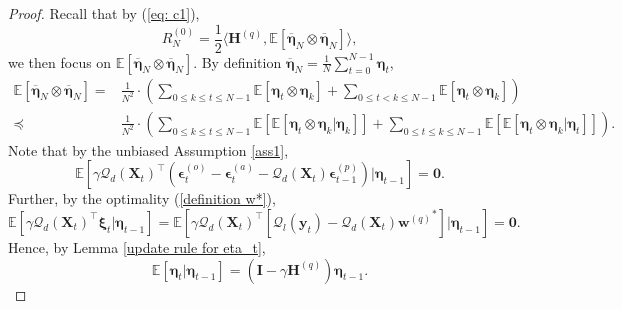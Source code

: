 \documentclass[11pt, letterpaper]{article}
\begin{document}
\begin{proof}
    Recall that by (\ref{eq: c1}),
    \begin{equation*}
        R_N^{(0)}=\frac{1}{2}\langle\mathbf{H}^{(q)},\mathbb{E}[\overline{\boldsymbol{\eta}}_N\otimes\overline{\boldsymbol{\eta}}_N]\rangle,
    \end{equation*}
    we then focus on $\mathbb{E}[\overline{\boldsymbol{\eta}}_{N}\otimes\overline{\boldsymbol{\eta}}_{N}]$. By definition $\overline{\boldsymbol{\eta}}_{N}=\frac{1}{N}\sum_{t=0}^{N-1}\boldsymbol{\eta}_{t}$,
    \begin{equation}
    \label{D0}
        \begin{aligned}
            \mathbb{E}[\overline{\boldsymbol{\eta}}_{N}\otimes\overline{\boldsymbol{\eta}}_{N}]
            =&\frac{1}{N^2}\cdot\left(\sum_{0\leq k\leq t\leq N-1}\mathbb{E}[\boldsymbol{\eta}_t\otimes\boldsymbol{\eta}_k]+\sum_{0\leq t<k\leq N-1}\mathbb{E}[\boldsymbol{\eta}_t\otimes\boldsymbol{\eta}_k]\right) \\
            \preceq&\frac{1}{N^2}\cdot\left(\sum_{0\leq k\leq t\leq N-1}\mathbb{E}\left[\mathbb{E}[\boldsymbol{\eta}_t\otimes\boldsymbol{\eta}_k|\boldsymbol{\eta}_k]\right]+\sum_{0\leq t\leq k\leq N-1}\mathbb{E}\left[\mathbb{E}[\boldsymbol{\eta}_t\otimes\boldsymbol{\eta}_k|\boldsymbol{\eta}_t]\right]\right).
        \end{aligned}
    \end{equation}
    Note that by the unbiased Assumption \ref{ass1},
    \begin{equation*}
        \mathbb{E}\left[\gamma{\mathcal{Q}_d(\mathbf{X}_t)}^\top \left(\boldsymbol{\epsilon}_t^{(o)}-\boldsymbol{\epsilon}_t^{(a)}-\mathcal{Q}_d(\mathbf{X}_t)\boldsymbol{\epsilon}_{t-1}^{(p)}\right)\bigg|\boldsymbol{\eta}_{t-1}\right]=\boldsymbol{0}.
    \end{equation*}
    Further, by the optimality (\ref{definition w*}),
    \begin{equation*}
        \mathbb{E}\left[\gamma{\mathcal{Q}_d(\mathbf{X}_t)}^\top \boldsymbol{\xi}_t\bigg|\boldsymbol{\eta}_{t-1}\right]=\mathbb{E}\left[\gamma{\mathcal{Q}_d(\mathbf{X}_t)}^\top \left[\mathcal{Q}_l(\mathbf{y}_t)-\mathcal{Q}_d(\mathbf{X}_t){\mathbf{w}^{(q)}}^*\right]\bigg|\boldsymbol{\eta}_{t-1}\right]=\boldsymbol{0}.
    \end{equation*}
    Hence, by Lemma \ref{update rule for eta_t},
    \begin{equation}
        \label{conditional update}
        \mathbb{E}\left[\boldsymbol{\eta}_t|\boldsymbol{\eta}_{t-1}\right]=\left(\mathbf{I}-\gamma \mathbf{H}^{(q)}\right)\boldsymbol{\eta}_{t-1}.

\end{equation}
\end{proof}
\end{document}
